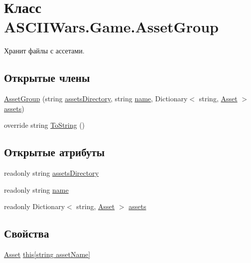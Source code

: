 \hypertarget{class_a_s_c_i_i_wars_1_1_game_1_1_asset_group}{}\section{Класс A\+S\+C\+I\+I\+Wars.\+Game.\+Asset\+Group}
\label{class_a_s_c_i_i_wars_1_1_game_1_1_asset_group}


Хранит файлы с ассетами.  


\subsection*{Открытые члены}
\begin{DoxyCompactItemize}
\item 
\hyperlink{class_a_s_c_i_i_wars_1_1_game_1_1_asset_group_a0477f5fe9d3a2828e2ef4c2ddb7aa565}{Asset\+Group} (string \hyperlink{class_a_s_c_i_i_wars_1_1_game_1_1_asset_group_a6c7083ec7602a32f4e99601ef5d54397}{assets\+Directory}, string \hyperlink{class_a_s_c_i_i_wars_1_1_game_1_1_asset_group_aeb6e4bd616bf065ce4a04f5c34e9c3d9}{name}, Dictionary$<$ string, \hyperlink{class_a_s_c_i_i_wars_1_1_game_1_1_asset}{Asset} $>$ \hyperlink{class_a_s_c_i_i_wars_1_1_game_1_1_asset_group_ae2481944ac1b6ebe0f4e383ef7de141c}{assets})
\item 
override string \hyperlink{class_a_s_c_i_i_wars_1_1_game_1_1_asset_group_a16cbe328487eba763e92bb4551a67311}{To\+String} ()
\end{DoxyCompactItemize}
\subsection*{Открытые атрибуты}
\begin{DoxyCompactItemize}
\item 
readonly string \hyperlink{class_a_s_c_i_i_wars_1_1_game_1_1_asset_group_a6c7083ec7602a32f4e99601ef5d54397}{assets\+Directory}
\item 
readonly string \hyperlink{class_a_s_c_i_i_wars_1_1_game_1_1_asset_group_aeb6e4bd616bf065ce4a04f5c34e9c3d9}{name}
\item 
readonly Dictionary$<$ string, \hyperlink{class_a_s_c_i_i_wars_1_1_game_1_1_asset}{Asset} $>$ \hyperlink{class_a_s_c_i_i_wars_1_1_game_1_1_asset_group_ae2481944ac1b6ebe0f4e383ef7de141c}{assets}
\end{DoxyCompactItemize}
\subsection*{Свойства}
\begin{DoxyCompactItemize}
\item 
\hyperlink{class_a_s_c_i_i_wars_1_1_game_1_1_asset}{Asset} \hyperlink{class_a_s_c_i_i_wars_1_1_game_1_1_asset_group_ada6ec78bb13c41b4f8309f91b4adeecc}{this\mbox{[}string asset\+Name\mbox{]}}
\end{DoxyCompactItemize}



